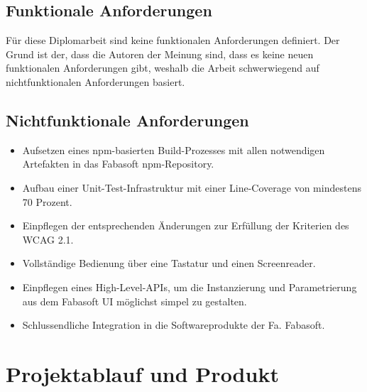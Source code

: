 \subsection{Funktionale Anforderungen}
Für diese Diplomarbeit sind keine funktionalen Anforderungen definiert. Der Grund ist der, dass die Autoren der Meinung sind, dass es keine neuen funktionalen Anforderungen gibt, weshalb die Arbeit schwerwiegend auf nichtfunktionalen Anforderungen basiert.

\subsection{Nichtfunktionale Anforderungen}

\begin{itemize}
	\item Aufsetzen eines npm-basierten Build-Prozesses mit allen notwendigen Artefakten in das Fabasoft npm-Repository.
	\item Aufbau einer Unit-Test-Infrastruktur mit einer Line-Coverage von mindestens 70 Prozent.
	\item Einpflegen der entsprechenden Änderungen zur Erfüllung der Kriterien des WCAG 2.1.
	\item Vollständige Bedienung über eine Tastatur und einen Screenreader.
	\item Einpflegen eines High-Level-APIs, um die Instanzierung und Parametrierung aus dem Fabasoft UI möglichst simpel zu gestalten.
	\item Schlussendliche Integration in die Softwareprodukte der Fa. Fabasoft.
\end{itemize}

\section{Projektablauf und Produkt}
